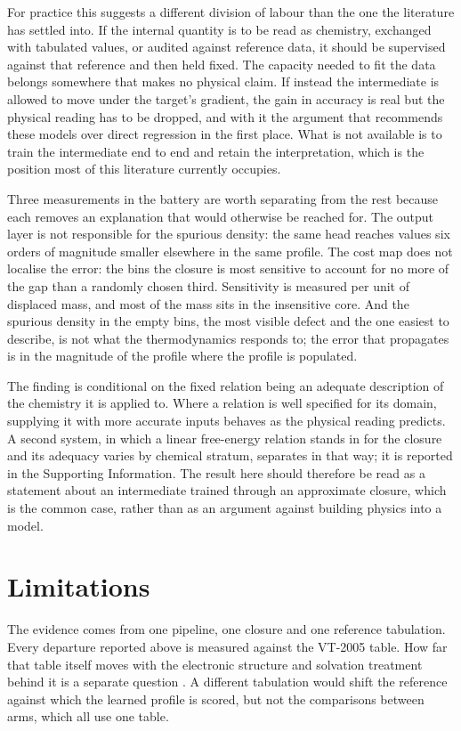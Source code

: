 For practice this suggests a different division of labour than the one the literature has settled
into. If the internal quantity is to be read as chemistry, exchanged with tabulated values, or audited against reference data, it should be supervised against that reference and then held fixed. The capacity needed to fit the data belongs somewhere that makes no physical claim.
If instead the intermediate is allowed to move under the target's gradient, the gain in accuracy
is real but the physical reading has to be dropped, and with it the argument that recommends these
models over direct regression in the first place. What is not available is to train the
intermediate end to end and retain the interpretation, which is the position most of this
literature currently occupies.

Three measurements in the battery are worth separating from the rest because each removes an
explanation that would otherwise be reached for. The output layer is not responsible for the
spurious density: the same head reaches values six orders of magnitude smaller elsewhere in the
same profile. The cost map does not localise the error: the bins the closure is most sensitive to account for no more of the gap than a randomly chosen third. Sensitivity is measured per unit of displaced mass, and most of the mass sits in the insensitive core. And the spurious
density in the empty bins, the most visible defect and the one easiest to describe, is not what the
thermodynamics responds to; the error that propagates is in the magnitude of the profile where the
profile is populated.

The finding is conditional on the fixed relation being an adequate description of the chemistry it
is applied to. Where a relation is well specified for its domain, supplying it with more accurate inputs behaves as the physical reading predicts. A second system, in which a linear free-energy relation stands in for the closure and its adequacy varies by chemical stratum, separates in that way; it is reported in the Supporting Information. The result here should therefore be read as a
statement about an intermediate trained through an approximate closure, which is the common case,
rather than as an argument against building physics into a model.

\section{Limitations}
\label{sec:limitations}

The evidence comes from one pipeline, one closure and one reference tabulation. Every departure reported above is measured against the VT-2005 table. How far that table itself moves with the electronic structure and solvation treatment behind it is a separate question \cite{salih2025sigma}. A different tabulation would shift the reference against which the learned profile is scored, but not the comparisons between arms, which all use one table.

